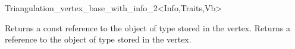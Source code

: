 \begin{ccRefClass}{Triangulation_vertex_base_with_info_2<Info,Traits,Vb>}

\ccAccessFunctions
{}

\ccTagFullDeclarations

{Returns a const reference to the object of type  stored in the
vertex.}
\ccGlue
{}
{Returns a reference to the object of type  stored in the vertex.}


\ccSeeAlso

\\
 \\
 \\


\end{ccRefClass}


